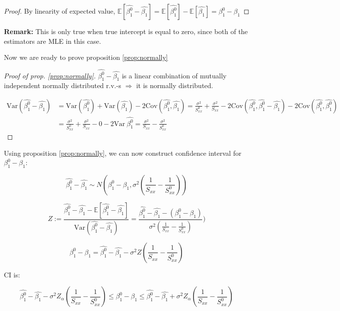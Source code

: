 \documentclass[12pt,a4paper,oneside]{book} %
\newcommand{\E}{\mathbb{E}}
\newcommand{\Var}{\mathrm{Var}}
\newcommand{\Cov}{\mathrm{Cov}}
\begin{document}
\begin{proof}
	By linearity of expected value, $\E [\hat{\beta_1^0}-\hat{\beta_1}]= \E[\hat{\beta_1^0}] - \E[\hat{\beta_1}]= \beta_1^0-\beta_1 $
\end{proof}

\textbf{Remark:} This is only true when true intercept is equal to zero, since both of the estimators are MLE in this case.
	
	Now we are ready to prove proposition \ref{prop:normally}
\begin{proof}[Proof of prop. \ref{prop:normally}]
	$\hat{\beta_1^0}-\hat{\beta_1}$ is a linear combination of mutually independent normally distributed r.v.-s $\Rightarrow$ it is normally distributed.
	
	
	\begin{align*}
		\Var (\hat{\beta_1^0}-\hat{\beta_1})&=\Var(\hat{\beta_1^0}) + \Var(\hat{\beta_1}) - 2 \Cov (\hat{\beta_1^0},\hat{\beta_1}) =\frac{\sigma^2}{S_{xx}^0}+\frac{\sigma^2}{S_{xx}}-2 \Cov (\hat{\beta_1^0},\hat{\beta_1^0}-\hat{\beta_1})-2 \Cov (\hat{\beta_1^0},\hat{\beta_1^0}) \\
		&= \frac{\sigma^2}{S_{xx}^0}+\frac{\sigma^2}{S_{xx}} - 0 -2 \Var \ \hat{\beta_1^0}=\frac{\sigma^2}{S_{xx}}-\frac{\sigma^2}{S_{xx}^0}
	\end{align*}
\end{proof}
	
Using proposition \ref{prop:normally}, we can now construct confidence interval for $\beta_1^0-\beta_1$:

\[
			\hat{\beta_1^0}-\hat{\beta_1} \sim N(\beta_1^0-\beta_1, \sigma^2(\frac{1}{S_{xx}}-\frac{1}{S_{xx}^0}))
\]

\[
	Z := \frac{\hat{\beta_1^0}-\hat{\beta_1}-\E [\hat{\beta_1^0}-\hat{\beta_1}]}{\Var (\hat{\beta_1^0}-\hat{\beta_1})}= \frac{\hat{\beta_1^0}-\hat{\beta_1}-(\beta_1^0-\beta_1)}{\sigma^2(\frac{1}{S_{xx}}-\frac{1}{S_{xx}^0})})
\]

\[
	\beta_1^0-\beta_1= \hat{\beta_1^0}-\hat{\beta_1} - \sigma^2 Z(\frac{1}{S_{xx}}-\frac{1}{S_{xx}^0})
\]

CI is:

\begin{equation}
\hat{\beta_1^0}-\hat{\beta_1} - \sigma^2 Z_{\alpha}(\frac{1}{S_{xx}}-\frac{1}{S_{xx}^0}) \leq \beta_1^0-\beta_1 \leq \hat{\beta_1^0}-\hat{\beta_1} + \sigma^2 Z_{\alpha}(\frac{1}{S_{xx}}-\frac{1}{S_{xx}^0})
\end{equation}
\end{document}
